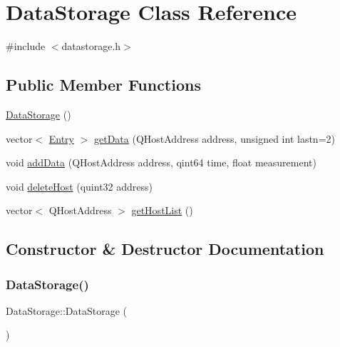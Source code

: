 \hypertarget{class_data_storage}{}\section{Data\+Storage Class Reference}
\label{class_data_storage}


{\ttfamily \#include $<$datastorage.\+h$>$}

\subsection*{Public Member Functions}
\begin{DoxyCompactItemize}
\item 
\mbox{\hyperlink{class_data_storage_a22825d40495dae6a5df46d629fb26a3f}{Data\+Storage}} ()
\item 
vector$<$ \mbox{\hyperlink{struct_entry}{Entry}} $>$ \mbox{\hyperlink{class_data_storage_a716fe9bd808cb8ea9f0ef153bf01a633}{get\+Data}} (Q\+Host\+Address address, unsigned int lastn=2)
\item 
void \mbox{\hyperlink{class_data_storage_ab46b18762db5b17b3e0a97150079cb78}{add\+Data}} (Q\+Host\+Address address, qint64 time, float measurement)
\item 
void \mbox{\hyperlink{class_data_storage_a6d1d74566ca198c807a9dbbb16019472}{delete\+Host}} (quint32 address)
\item 
vector$<$ Q\+Host\+Address $>$ \mbox{\hyperlink{class_data_storage_a05e60f4e62fb68f588e3f381d40b6bbd}{get\+Host\+List}} ()
\end{DoxyCompactItemize}


\subsection{Constructor \& Destructor Documentation}
\mbox{\label{class_data_storage_a22825d40495dae6a5df46d629fb26a3f}} 
\subsubsection{\texorpdfstring{Data\+Storage()}{DataStorage()}}
{\footnotesize\ttfamily Data\+Storage\+::\+Data\+Storage (\begin{DoxyParamCaption}{ }\end{DoxyParamCaption})}



